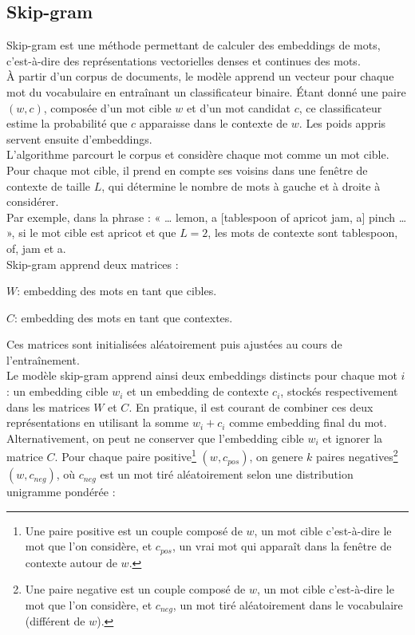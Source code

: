 \documentclass[12pt,a4paper]{report}
\begin{document}
	\subsection{Skip-gram}
	Skip-gram est une méthode permettant de calculer des embeddings de mots, c’est-à-dire des représentations vectorielles denses et continues des mots.\\
	À partir d’un corpus de documents, le modèle apprend un vecteur pour chaque mot du vocabulaire en entraînant un classificateur binaire. Étant donné une paire $(w,c)$, composée d’un mot cible $w$ et d’un mot candidat $c$, ce classificateur estime la probabilité que $c$ apparaisse dans le contexte de $w$. Les poids appris servent ensuite d’embeddings.\\
	L’algorithme parcourt le corpus et considère chaque mot comme un mot cible. Pour chaque mot cible, il prend en compte ses voisins dans une fenêtre de contexte de taille $L$, qui détermine le nombre de mots à gauche et à droite à considérer.\\
	Par exemple, dans la phrase : « … lemon, a [tablespoon of apricot jam, a] pinch … », si le mot cible est apricot et que $L=2$, les mots de contexte sont tablespoon, of, jam et a.\\
	Skip-gram apprend deux matrices :
	\begin{itemizeFB}
		\item $W$: embedding des mots en tant que cibles.
		\item $C$: embedding des mots en tant que contextes.
	\end{itemizeFB}
	Ces matrices sont initialisées aléatoirement puis ajustées au cours de l’entraînement.\\
	Le modèle skip-gram apprend ainsi deux embeddings distincts pour chaque mot $i$ :
	un embedding cible $w_i$ et un embedding de contexte $c_i$, stockés respectivement dans les matrices $W$ et $C$.
	En pratique, il est courant de combiner ces deux représentations en utilisant la somme $w_i + c_i$ comme embedding final du mot. Alternativement, on peut ne conserver que l’embedding cible $w_i$ et ignorer la matrice $C$.
	Pour chaque paire positive\footnote{Une paire positive est un couple composé de $w$, un mot cible c'est-à-dire le mot que l'on considère, et $c_{pos}$, un vrai mot qui apparaît dans la fenêtre de contexte autour de $w$.} $(w, c_{pos})$, on genere $k$ paires negatives\footnote{Une paire negative est un couple composé de $w$, un mot cible c'est-à-dire le mot que l'on considère, et $c_{neg}$, un mot tiré aléatoirement dans le vocabulaire (différent de $w$).} $(w, c_{neg})$, où $c_{neg}$ est un mot tiré aléatoirement selon une distribution unigramme pondérée :\\
\end{document}
